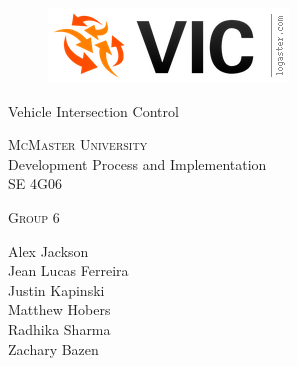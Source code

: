 \documentclass [12pt]{article}
\begin{document}
					   \begin {center} 
					   	
							\thispagestyle{empty}
								\vspace*{4.5cm}


									
											\begin {figure}[h!]
													\centering
															\includegraphics [scale = .5, trim={.4cm 0 .8cm 0},clip] {figures/vic_logo.png}
																\end {figure}

																	{\fontfamily{\cabinfamily}\selectfont
																		\Huge{Vehicle Intersection Control} }
																			
																				\vspace{1 cm}
																					{\LARGE{\textsc{McMaster University}}\\}  \vspace {1cm}
																						{\Large Development Process and Implementation\\ \vspace {0.5 cm} SE 4G06}  \vspace {1cm}

																								{\large \textsc{Group 6} \\} \vspace{1cm}

																									{
																											Alex Jackson \\
																													Jean Lucas Ferreira \\
																															Justin Kapinski\\
																																	Matthew Hobers\\
																																			Radhika Sharma\\
																																					Zachary Bazen}

																																						

																																								
																																									\end{center}
																																										
																																											
\end{document}
